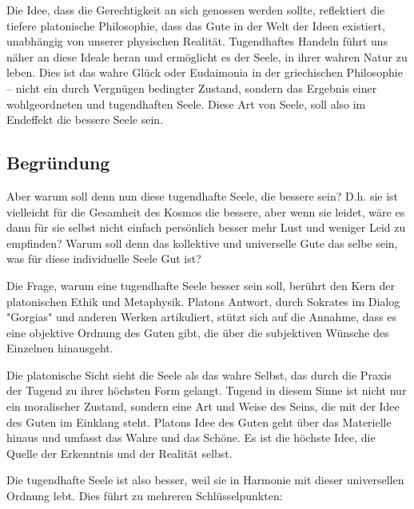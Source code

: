 \documentclass[12pt,a4paper]{article}
\begin{document}
Die Idee, dass die Gerechtigkeit an sich genossen werden sollte, reflektiert die tiefere platonische Philosophie, dass das Gute in der Welt der Ideen existiert, unabhängig von unserer physischen Realität. Tugendhaftes Handeln führt uns näher an diese Ideale heran und ermöglicht es der Seele, in ihrer wahren Natur zu leben. Dies ist das wahre Glück oder Eudaimonia in der griechischen Philosophie – nicht ein durch Vergnügen bedingter Zustand, sondern das Ergebnis einer wohlgeordneten und tugendhaften Seele. Diese Art von Seele, soll also im Endeffekt die bessere Seele sein.

\subsection[short]{Begründung}
Aber warum soll denn nun diese tugendhafte Seele, die bessere sein? D.h. sie ist vielleicht für die Gesamheit des Kosmos die bessere, aber wenn sie leidet, wäre es dann für sie selbst nicht einfach persönlich besser mehr Lust und weniger Leid zu empfinden? Warum soll denn das kollektive und universelle Gute das selbe sein, was für diese individuelle Seele Gut ist?

Die Frage, warum eine tugendhafte Seele besser sein soll, berührt den Kern der platonischen Ethik und Metaphysik. Platons Antwort, durch Sokrates im Dialog "Gorgias" und anderen Werken artikuliert, stützt sich auf die Annahme, dass es eine objektive Ordnung des Guten gibt, die über die subjektiven Wünsche des Einzelnen hinausgeht.

Die platonische Sicht sieht die Seele als das wahre Selbst, das durch die Praxis der Tugend zu ihrer höchsten Form gelangt. Tugend in diesem Sinne ist nicht nur ein moralischer Zustand, sondern eine Art und Weise des Seins, die mit der Idee des Guten im Einklang steht. Platons Idee des Guten geht über das Materielle hinaus und umfasst das Wahre und das Schöne. Es ist die höchste Idee, die Quelle der Erkenntnis und der Realität selbst.

Die tugendhafte Seele ist also besser, weil sie in Harmonie mit dieser universellen Ordnung lebt. Dies führt zu mehreren Schlüsselpunkten:
\end{document}
